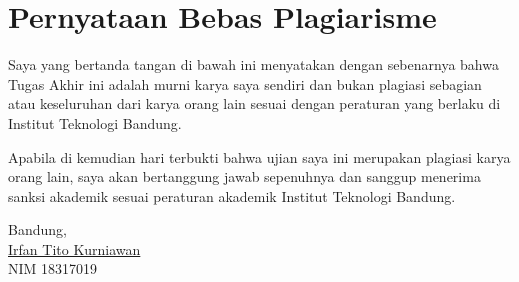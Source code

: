 \chapter*{Pernyataan Bebas Plagiarisme}

Saya yang bertanda tangan di bawah ini menyatakan dengan sebenarnya bahwa Tugas Akhir ini adalah murni karya saya sendiri dan bukan plagiasi sebagian atau keseluruhan dari karya orang lain sesuai dengan peraturan yang berlaku di Institut Teknologi Bandung.

Apabila di kemudian hari terbukti bahwa ujian saya ini merupakan plagiasi karya orang lain, saya akan bertanggung jawab sepenuhnya dan sanggup menerima sanksi akademik sesuai peraturan akademik Institut Teknologi Bandung.
\\[\baselineskip]

\begin{flushright}

Bandung, \thedate \\[4\baselineskip]
\underline{Irfan Tito Kurniawan} \\
NIM 18317019

\end{flushright}
